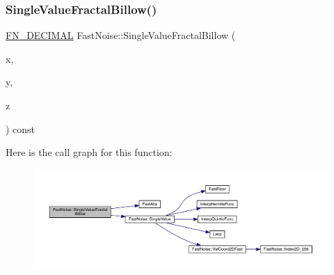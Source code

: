 \subsubsection{\texorpdfstring{Single\+Value\+Fractal\+Billow()}{SingleValueFractalBillow()}\hspace{0.1cm}{\footnotesize\ttfamily [2/2]}}
{\footnotesize\ttfamily \mbox{\hyperlink{_fast_noise_8h_a75a9ef6d2541c4921815b885bfd449c3}{F\+N\+\_\+\+D\+E\+C\+I\+M\+AL}} Fast\+Noise\+::\+Single\+Value\+Fractal\+Billow (\begin{DoxyParamCaption}\item[{\mbox{\hyperlink{_fast_noise_8h_a75a9ef6d2541c4921815b885bfd449c3}{F\+N\+\_\+\+D\+E\+C\+I\+M\+AL}}}]{x,  }\item[{\mbox{\hyperlink{_fast_noise_8h_a75a9ef6d2541c4921815b885bfd449c3}{F\+N\+\_\+\+D\+E\+C\+I\+M\+AL}}}]{y,  }\item[{\mbox{\hyperlink{_fast_noise_8h_a75a9ef6d2541c4921815b885bfd449c3}{F\+N\+\_\+\+D\+E\+C\+I\+M\+AL}}}]{z }\end{DoxyParamCaption}) const\hspace{0.3cm}{\ttfamily [private]}}

Here is the call graph for this function\+:
\nopagebreak
\begin{figure}[H]
\begin{center}
\leavevmode
\includegraphics[width=350pt]{class_fast_noise_ac2534a36b0dfb1c6337a512787511754_cgraph}
\end{center}
\end{figure}
\mbox{\label{class_fast_noise_a19cdde687bd3d06fa84ea16f52dfe96b}} 
